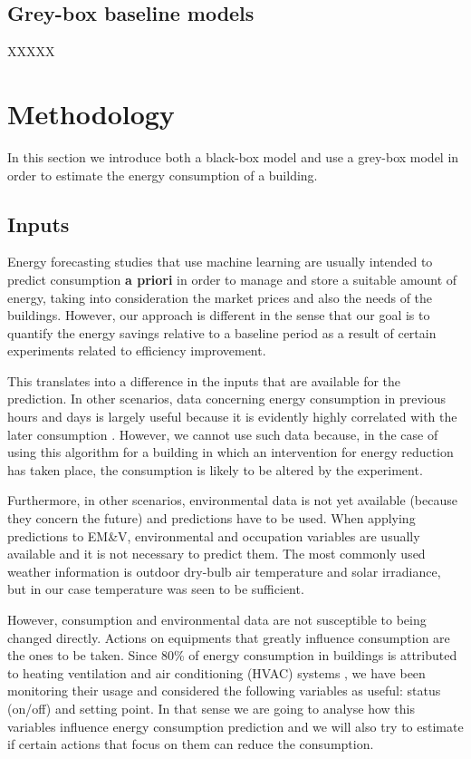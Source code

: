 \documentclass[10pt, conference, compsocconf]{IEEEtran}
\begin{document}
\subsection{Grey-box baseline models}


XXXXX

\section{Methodology}

In this section we introduce both a black-box model and use a grey-box model in order to estimate the energy consumption of a building.

\subsection{Inputs}


Energy forecasting studies that use machine learning are usually intended to predict consumption \textbf{a priori} in order to manage and store a suitable amount of energy, taking into consideration the market prices and also the needs of the buildings. However, our approach is different in the sense that our goal is to quantify the energy savings relative to a baseline period as a result of certain experiments related to efficiency improvement. 

This translates into a difference in the inputs that are available for the prediction. In other scenarios, data concerning energy consumption in previous hours and days is largely useful because it is evidently highly correlated with the later consumption \cite{aman2014empirical}. However, we cannot use such data because, in the case of using this algorithm for a building in which an intervention for energy reduction has taken place, the consumption is likely to be altered by the experiment.

Furthermore, in other scenarios, environmental data is not yet available (because they concern the future) and predictions have to be used. When applying predictions to EM\&V, environmental and occupation variables are usually available and it is not necessary to predict them. The most commonly used weather information is outdoor dry-bulb air temperature and solar irradiance, but in our case temperature was seen to be sufficient.

However, consumption and environmental data are not susceptible to being changed directly. Actions on equipments that greatly influence consumption are the ones to be taken. Since 80\% of energy consumption in buildings is attributed to heating ventilation and air conditioning (HVAC) systems \cite{inform}, we have been monitoring their usage and considered the following variables as useful: status (on/off) and setting point. In that sense we are going to analyse how this variables influence energy consumption prediction and we will also try to estimate if certain actions that focus on them can reduce the consumption.
\end{document}
